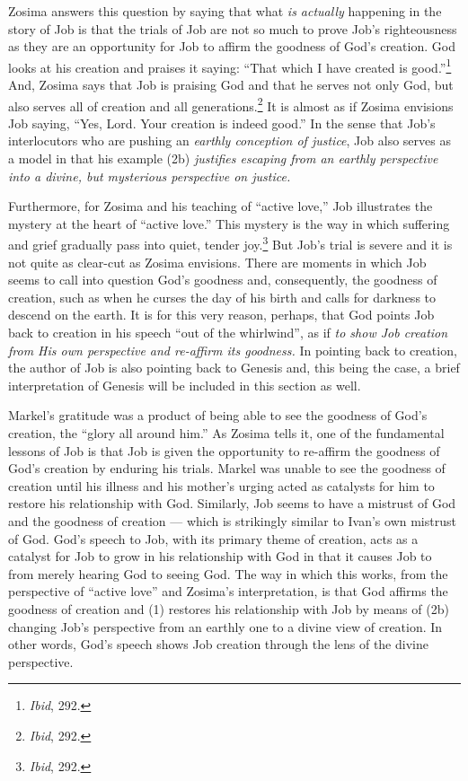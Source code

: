 Zosima answers this question by saying that what \emph{is actually} happening in the story of Job is that the trials of Job are not so much to prove Job's righteousness as they are an opportunity for Job to affirm the goodness of God's creation. God looks at his creation and praises it saying: ``That which I have created is good.''\footnote{\emph{Ibid}, 292.} And, Zosima says that Job is praising God and that he serves not only God, but also serves all of creation and all generations.\footnote{\emph{Ibid}, 292.} It is almost as if Zosima envisions Job saying, ``Yes, Lord. Your creation is indeed good.'' In the sense that Job's interlocutors who are pushing an \emph{earthly conception of justice}, Job also serves as a model in that his example (2b) \emph{justifies escaping from an earthly perspective into a divine, but mysterious perspective on justice.}

Furthermore, for Zosima and his teaching of ``active love,'' Job illustrates the mystery at the heart of ``active love.'' This mystery is the way in which suffering and grief gradually pass into quiet, tender joy.\footnote{\emph{Ibid}, 292.} But Job's trial is severe and it is not quite as clear-cut as Zosima envisions. There are moments in which Job seems to call into question God's goodness and, consequently, the goodness of creation, such as when he curses the day of his birth and calls for darkness to descend on the earth. It is for this very reason, perhaps, that God points Job back to creation in his speech ``out of the whirlwind'', as if \emph{to show Job creation from His own perspective and re-affirm its goodness.} In pointing back to creation, the author of Job is also pointing back to Genesis and, this being the case, a brief interpretation of Genesis will be included in this section as well.

Markel's gratitude was a product of being able to see the goodness of God's creation, the ``glory all around him.'' As Zosima tells it, one of the fundamental lessons of Job is that Job is given the opportunity to re-affirm the goodness of God's creation by enduring his trials. Markel was unable to see the goodness of creation until his illness and his mother's urging acted as catalysts for him to restore his relationship with God. Similarly, Job seems to have a mistrust of God and the goodness of creation --- which is strikingly similar to Ivan's own mistrust of God. God's speech to Job, with its primary theme of creation, acts as a catalyst for Job to grow in his relationship with God in that it causes Job to from merely hearing God to seeing God. The way in which this works, from the perspective of ``active love'' and Zosima's interpretation, is that God affirms the goodness of creation and (1) restores his relationship with Job by means of (2b) changing Job's perspective from an earthly one to a divine view of creation. In other words, God's speech shows Job creation through the lens of the divine perspective.

